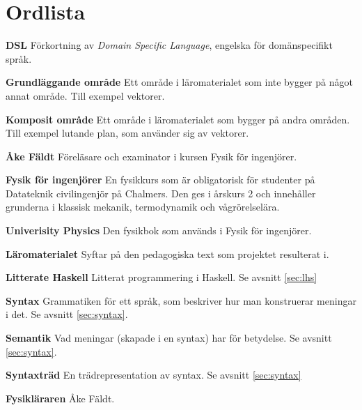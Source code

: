 
\chapter*{Ordlista}


\textbf{DSL} Förkortning av \textit{Domain Specific Language}, engelska för domänspecifikt språk.

\textbf{Grundläggande område} Ett område i läromaterialet som inte bygger på något annat område. Till exempel vektorer.

\textbf{Komposit område} Ett område i läromaterialet som bygger på andra områden. Till exempel lutande plan, som använder sig av vektorer.

\textbf{Åke Fäldt} Föreläsare och examinator i kursen Fysik för ingenjörer.

\textbf{Fysik för ingenjörer} En fysikkurs som är obligatorisk för studenter på Datateknik civilingenjör på Chalmers. Den ges i årskurs 2 och innehåller grunderna i klassisk mekanik, termodynamik och vågrörelselära.

\textbf{Univerisity Physics} Den fysikbok som används i Fysik för ingenjörer.

\textbf{Läromaterialet} Syftar på den pedagogiska text som projektet resulterat i.

\textbf{Litterate Haskell} Litterat programmering i Haskell. Se avsnitt \ref{sec:lhs}

\textbf{Syntax} Grammatiken för ett språk, som beskriver hur man konstruerar meningar i det. Se avsnitt \ref{sec:syntax}.

\textbf{Semantik} Vad meningar (skapade i en syntax) har för betydelse. Se avsnitt \ref{sec:syntax}.

\textbf{Syntaxträd} En trädrepresentation av syntax. Se avsnitt \ref{sec:syntax}

\textbf{Fysikläraren} Åke Fäldt.

